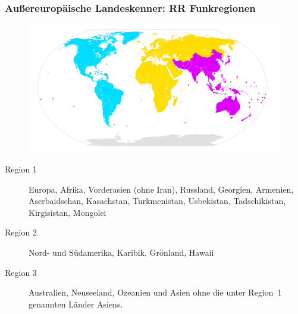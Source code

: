 \begin{frame}
  \frametitle{Außereuropäische Landeskenner: RR Funkregionen}

  \begin{center}
    \begin{figure}
      \includegraphics[width=.7\textheight]{bv06/International_Telecommunication_Union_region-800px.png}
    \end{figure}
  \end{center}

  \small{
  \begin{description}
    \item[Region 1] Europa, Afrika, Vorderasien (ohne Iran), Russland, Georgien,
      Armenien, Aserbaidschan, Kasachstan, Turkmenistan,
      Usbekistan, Tadschikistan, Kirgisistan, Mongolei
    \item[Region 2] Nord- und Südamerika, Karibik, Grönland, Hawaii
    \item[Region 3] Australien, Neuseeland, Ozeanien und Asien ohne die unter
      Region~1 genannten Länder Asiens.
  \end{description}
  }

\end{frame}

